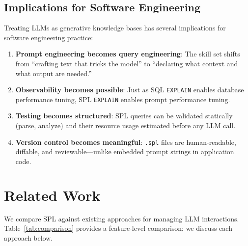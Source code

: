 \documentclass[11pt,a4paper]{article}
\begin{document}
\subsection{Implications for Software Engineering}

Treating LLMs as generative knowledge bases has several implications for software engineering practice:

\begin{enumerate}[nosep]
  \item \textbf{Prompt engineering becomes query engineering}: The skill set shifts from ``crafting text that tricks the model'' to ``declaring what context and what output are needed.''
  \item \textbf{Observability becomes possible}: Just as SQL \texttt{EXPLAIN} enables database performance tuning, SPL \texttt{EXPLAIN} enables prompt performance tuning.
  \item \textbf{Testing becomes structured}: SPL queries can be validated statically (parse, analyze) and their resource usage estimated before any LLM call.
  \item \textbf{Version control becomes meaningful}: \texttt{.spl} files are human-readable, diffable, and reviewable---unlike embedded prompt strings in application code.
\end{enumerate}

\section{Related Work}
\label{sec:related}

We compare SPL against existing approaches for managing LLM interactions. Table~\ref{tab:comparison} provides a feature-level comparison; we discuss each approach below.
\end{document}
